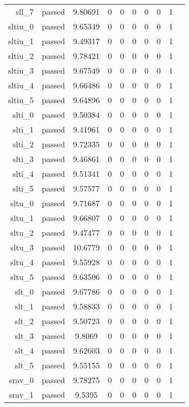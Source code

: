 \begin{longtable}{r|ccccccccc}
    sll\_7 & passed & 9.80691 & 0 & 0 & 0 & 0 & 0 & 1 \\
    sltiu\_0 & passed & 9.65349 & 0 & 0 & 0 & 0 & 0 & 1 \\
    sltiu\_1 & passed & 9.49317 & 0 & 0 & 0 & 0 & 0 & 1 \\
    sltiu\_2 & passed & 9.78421 & 0 & 0 & 0 & 0 & 0 & 1 \\
    sltiu\_3 & passed & 9.67549 & 0 & 0 & 0 & 0 & 0 & 1 \\
    sltiu\_4 & passed & 9.66486 & 0 & 0 & 0 & 0 & 0 & 1 \\
    sltiu\_5 & passed & 9.64896 & 0 & 0 & 0 & 0 & 0 & 1 \\
    slti\_0 & passed & 9.50384 & 0 & 0 & 0 & 0 & 0 & 1 \\
    slti\_1 & passed & 9.41961 & 0 & 0 & 0 & 0 & 0 & 1 \\
    slti\_2 & passed & 9.72335 & 0 & 0 & 0 & 0 & 0 & 1 \\
    slti\_3 & passed & 9.46861 & 0 & 0 & 0 & 0 & 0 & 1 \\
    slti\_4 & passed & 9.51341 & 0 & 0 & 0 & 0 & 0 & 1 \\
    slti\_5 & passed & 9.57577 & 0 & 0 & 0 & 0 & 0 & 1 \\
    sltu\_0 & passed & 9.71687 & 0 & 0 & 0 & 0 & 0 & 1 \\
    sltu\_1 & passed & 9.66807 & 0 & 0 & 0 & 0 & 0 & 1 \\
    sltu\_2 & passed & 9.47477 & 0 & 0 & 0 & 0 & 0 & 1 \\
    sltu\_3 & passed & 10.6779 & 0 & 0 & 0 & 0 & 0 & 1 \\
    sltu\_4 & passed & 9.55928 & 0 & 0 & 0 & 0 & 0 & 1 \\
    sltu\_5 & passed & 9.63506 & 0 & 0 & 0 & 0 & 0 & 1 \\
    slt\_0 & passed & 9.67786 & 0 & 0 & 0 & 0 & 0 & 1 \\
    slt\_1 & passed & 9.58833 & 0 & 0 & 0 & 0 & 0 & 1 \\
    slt\_2 & passed & 9.50723 & 0 & 0 & 0 & 0 & 0 & 1 \\
    slt\_3 & passed & 9.8069 & 0 & 0 & 0 & 0 & 0 & 1 \\
    slt\_4 & passed & 9.62603 & 0 & 0 & 0 & 0 & 0 & 1 \\
    slt\_5 & passed & 9.55155 & 0 & 0 & 0 & 0 & 0 & 1 \\
    srav\_0 & passed & 9.78275 & 0 & 0 & 0 & 0 & 0 & 1 \\
    srav\_1 & passed & 9.5395 & 0 & 0 & 0 & 0 & 0 & 1 \\

\end{longtable}
